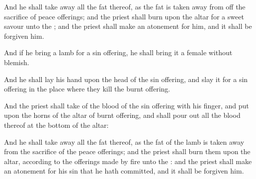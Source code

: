 {And he shall take
away all the
fat thereof, as the
fat is taken
away from off the
sacrifice of peace
offerings; and the
priest shall
burn
{} upon the
altar for a
sweet
savour unto the
{}; and the
priest shall make an
atonement for him, and it shall be
forgiven him.

And if he
bring a
lamb for a
sin
offering, he shall
bring it a
female without
blemish.

And he shall
lay his
hand upon the
head of the sin
offering, and
slay it for a sin
offering in the
place where they
kill the burnt
offering.

And the
priest shall
take of the
blood of the sin
offering with his
finger, and
put
{} upon the
horns of the
altar of burnt
offering, and shall pour
out all the
blood thereof at the
bottom of the
altar:

And he shall take
away all the
fat thereof, as the
fat of the
lamb is taken
away from the
sacrifice of the peace
offerings; and the
priest shall
burn them upon the
altar, according to the offerings made by
fire unto the
{}: and the
priest shall make an
atonement for his
sin that he hath
committed, and it shall be
forgiven him.




\par }
